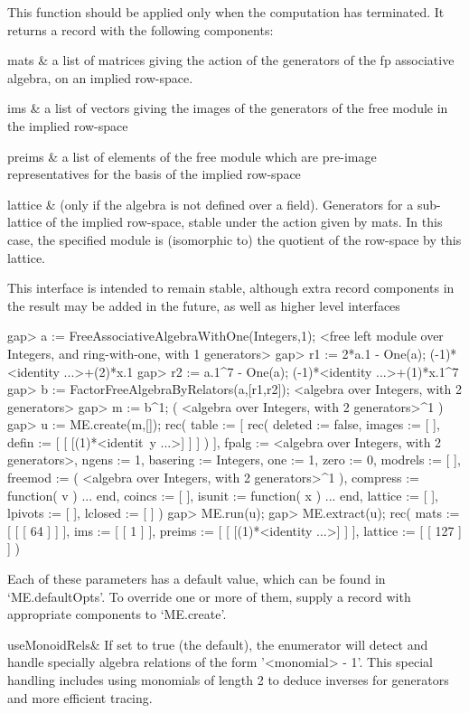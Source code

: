 This function should be applied only when the computation has
terminated. It returns a record with the following components:

\beginitems
mats & a list of matrices giving the action of the generators of the
fp associative algebra, on an implied row-space.

ims & a list of vectors giving the images of the generators of the
free module in the implied row-space

preims & a list of elements of the free module which are pre-image
representatives for the basis of the implied row-space

lattice & (only if the algebra is not defined over a
field). Generators for a sub-lattice of the implied row-space, stable
under the action given by mats. In this case, the specified module is
(isomorphic to) the quotient of the row-space by this lattice.
\enditems

This interface is intended to remain stable, although extra record
components in the result may be
added in the future, as well as higher level interfaces

\beginexample
gap> a := FreeAssociativeAlgebraWithOne(Integers,1);
<free left module over Integers, and ring-with-one, with 1 generators>
gap> r1 := 2*a.1 - One(a);
(-1)*<identity ...>+(2)*x.1
gap> r2 := a.1^7 - One(a);
(-1)*<identity ...>+(1)*x.1^7
gap> b := FactorFreeAlgebraByRelators(a,[r1,r2]);
<algebra over Integers, with 2 generators>
gap> m := b^1;
( <algebra over Integers, with 2 generators>^1 )
gap> u := ME.create(m,[]);
rec( 
  table := [ rec( deleted := false, images := [  ], defin := [ [ [(1)*<identit\
y ...>] ] ] ) ], fpalg := <algebra over Integers, with 2 generators>, 
  ngens := 1, basering := Integers, one := 1, zero := 0, modrels := [  ], 
  freemod := ( <algebra over Integers, with 2 generators>^1 ), 
  compress := function( v ) ... end, coincs := [  ], 
  isunit := function( x ) ... end, lattice := [  ], lpivots := [  ], 
  lclosed := [  ] )
gap> ME.run(u);
gap> ME.extract(u);
rec( mats := [ [ [ 64 ] ] ], ims := [ [ 1 ] ], 
  preims := [ [ [(1)*<identity ...>] ] ], lattice := [ [ 127 ] ] )
\endexample

\Section{Parameters}

Each of these parameters has a default value, which can be found in
`ME.defaultOpts'. To override one or more of them, supply a record with
appropriate components to `ME.create'. 

\beginitems
useMonoidRels& If set to true (the default), the enumerator will detect and handle
specially algebra relations of the form '<monomial> - 1'. This special
handling includes using monomials of length 2 to deduce inverses for
generators and more efficient tracing.

